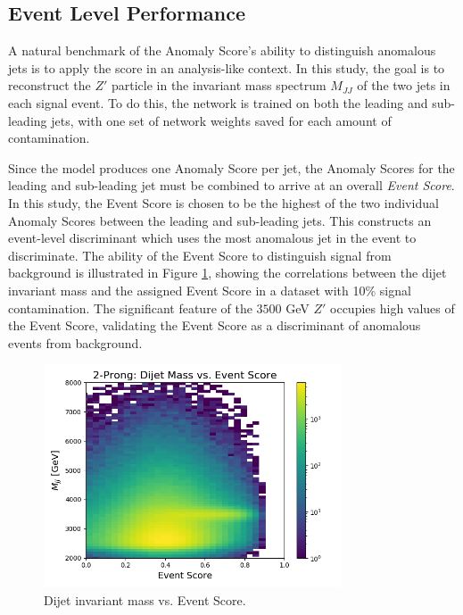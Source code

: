 \documentclass[11pt, a4paper]{article}
\begin{document}
\subsection{Event Level Performance}


A natural benchmark of the Anomaly Score's ability to distinguish anomalous jets is to apply the score in an analysis-like context. In this study, the goal is to reconstruct the $Z'$ particle in the invariant mass spectrum $M_{JJ}$ of the two jets in each signal event. To do this, the network is trained on both the leading and sub-leading jets, with one set of network weights saved for each amount of contamination. 

Since the model produces one Anomaly Score per jet, the Anomaly Scores for the leading and sub-leading jet must be combined to arrive at an overall \textit{Event Score}. In this study, the Event Score is chosen to be the highest of the two individual Anomaly Scores between the leading and sub-leading jets. This constructs an event-level discriminant which uses the most anomalous jet in the event to discriminate. The ability of the Event Score to distinguish signal from background is illustrated in Figure \ref{fig:mjj_vs_evscore}, showing the correlations between the dijet invariant mass and the assigned Event Score in a dataset with 10\% signal contamination. The significant feature of the $3500$ GeV $Z'$ occupies high values of the Event Score, validating the Event Score as a discriminant of anomalous events from background.

\begin{figure}[H]
	\begin{center}
		\includegraphics[width=250pt]{imgs/bugfix/ProcR_2Prong_Contaminated_10p0_2Prong_Contaminated_10p0_Weights_Event_ConstOnly_Avg_JJ_M_vs_Event_Score_SaveForPaper_Lead_Colorbar.png}
	\end{center}
	\caption{Dijet invariant mass vs. Event Score.}
	\label{fig:mjj_vs_evscore}
\end{figure}
\end{document}

